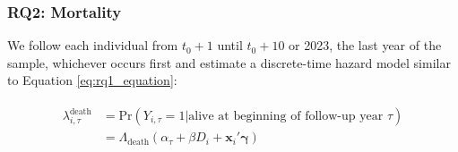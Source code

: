 \documentclass[a4paper,12pt]{article}
\theoremstyle{plain}
\theoremstyle{definition}
\theoremstyle{TheoremNum}
\theoremstyle{CorollaryNum}
\theoremstyle{PropositionNum}
\theoremstyle{TheoremNum}
\begin{document}

\subsubsection{RQ2: Mortality}

We follow each individual from $t_0+1$ until $t_0+10$ or 2023, the last year of the sample, whichever occurs first and estimate a discrete-time hazard model similar to Equation \ref{eq:rq1_equation}:

\begin{align}
\begin{split}
    \lambda_{i,\tau}^{\text{death}} & = \text{Pr}(Y_{i,\tau}=1 | \text{alive at beginning of follow-up year } \tau)\\
    & = \Lambda_{\text{death}}\left(\alpha_\tau + \beta D_i + \mathbf{x}_i'\mathbf{\gamma}\right)
\end{split}
\tag{2}\label{eq:rq2_equation_basic}
\end{align}
\end{document}
